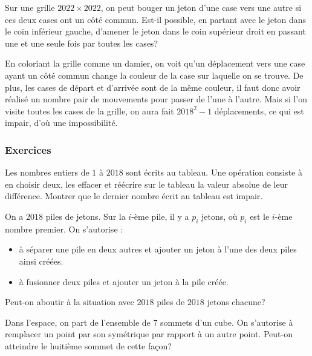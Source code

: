 \begin{exo}
Sur une grille $2022\times2022$, on peut bouger un jeton d'une case vers une autre si ces deux cases ont un côté commun. Est-il possible, en partant avec le jeton dans le coin inférieur gauche, d'amener le jeton dans le coin supérieur droit en passant une et une seule fois par toutes les cases?
\end{exo}

\begin{sol}
En coloriant la grille comme un damier, on voit qu'un déplacement vers une case ayant un côté commun change la couleur de la case sur laquelle on se trouve. De plus, les cases de départ et d'arrivée sont de la même couleur, il faut donc avoir réalisé un nombre pair de mouvements pour passer de l'une à l'autre. Mais si l'on visite toutes les cases de la grille, on aura fait $2018^2-1$ déplacements, ce qui est impair, d'où une impossibilité.
\end{sol}

\subsubsection{Exercices}

\begin{exo}
Les nombres entiers de $1$ à $2018$ sont écrits au tableau. Une opération consiste à en choisir deux, les effacer et réécrire sur le tableau la valeur absolue de leur différence. Montrer que le dernier nombre écrit au tableau est impair.
\end{exo}

\begin{exo}
On a $2018$ piles de jetons. Sur la $i$-ème pile, il y a $p_i$ jetons, où $p_i$ est le $i$-ème nombre premier. On s'autorise :
\begin{itemize}
\item
à séparer une pile en deux autres et ajouter un jeton à l'une des deux piles ainsi créées.
\item
à fusionner deux piles et ajouter un jeton à la pile créée.
\end{itemize}
Peut-on aboutir à la situation avec $2018$ piles de $2018$ jetons chacune?
\end{exo}

\begin{exo}
Dans l'espace, on part de l'ensemble de $7$ sommets d'un cube. On s'autorise à remplacer un point par son symétrique par rapport à un autre point. Peut-on atteindre le huitième sommet de cette façon?
\end{exo}


